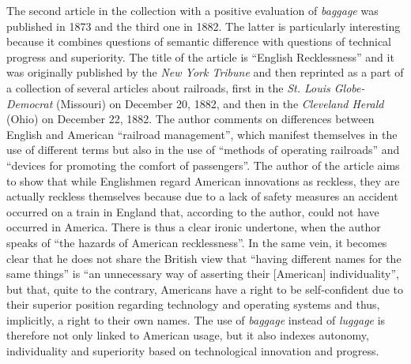The second article in the collection with a positive evaluation of \emph{baggage} was published in 1873 and the third one in 1882. The latter is particularly interesting because it combines questions of semantic difference with questions of technical progress and superiority. The title of the article is “English Recklessness” and it was originally published by the \emph{New York Tribune} and then reprinted as a part of a collection of several articles about railroads, first in the \emph{St. Louis Globe-Democrat} (Missouri) on December 20, 1882, and then in the \emph{Cleveland Herald} (Ohio) on December 22, 1882. The author comments on differences between English and American “railroad management”, which manifest themselves in the use of different terms but also in the use of “methods of operating railroads” and “devices for promoting the comfort of passengers”. The author of the article aims to show that while Englishmen regard American innovations as reckless, they are actually reckless themselves because due to a lack of safety measures an accident occurred on a train in England that, according to the author, could not have occurred in America. There is thus a clear ironic undertone, when the author speaks of “the hazards of American recklessness”. In the same vein, it becomes clear that he does not share the British view that “having different names for the same things” is “an unnecessary way of asserting their [American] individuality”, but that, quite to the contrary, Americans have a right to be self-confident due to their superior position regarding technology and operating systems and thus, implicitly, a right to their own names. The use of \emph{baggage} instead of \emph{luggage} is therefore not only linked to American usage, but it also indexes autonomy, individuality and superiority based on technological innovation and progress.

